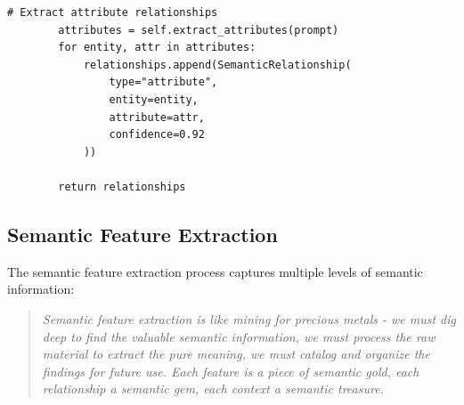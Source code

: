 \documentclass[11pt]{article}
\begin{document}
\begin{lstlisting}[style=python]
        # Extract attribute relationships
        attributes = self.extract_attributes(prompt)
        for entity, attr in attributes:
            relationships.append(SemanticRelationship(
                type="attribute",
                entity=entity,
                attribute=attr,
                confidence=0.92
            ))
        
        return relationships
\end{lstlisting}

\subsection{Semantic Feature Extraction}

The semantic feature extraction process captures multiple levels of semantic information:

\begin{quote}
\emph{Semantic feature extraction is like mining for precious metals - we must dig deep to find the valuable semantic information, we must process the raw material to extract the pure meaning, we must catalog and organize the findings for future use. Each feature is a piece of semantic gold, each relationship a semantic gem, each context a semantic treasure.}
\end{quote}
\end{document}
